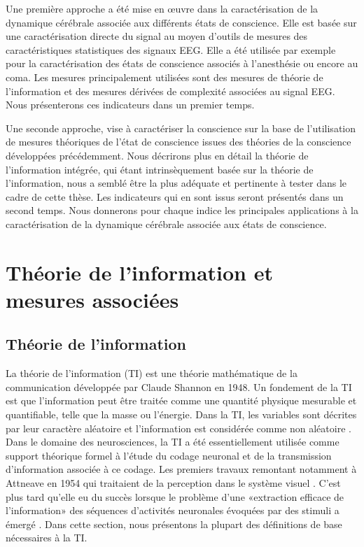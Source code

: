 Une première approche a été mise en œuvre dans la caractérisation de la dynamique cérébrale associée aux différents états de conscience. 
Elle est basée sur une caractérisation directe du signal au moyen d'outils de mesures des caractéristiques statistiques des signaux EEG. 
Elle a été utilisée par exemple pour la caractérisation des états de conscience associés à l'anesthésie ou encore au coma. 
Les mesures principalement utilisées sont des mesures de théorie de l'information et des mesures dérivées de complexité associées au signal EEG. 
Nous présenterons ces indicateurs dans un premier temps. 

Une seconde approche, vise à caractériser la conscience sur la base de l'utilisation de mesures théoriques de l'état de conscience issues des théories de la conscience développées précédemment. 
Nous décrirons plus en détail la théorie de l'information intégrée, qui étant intrinsèquement basée sur la théorie de l'information, nous a semblé être la plus adéquate et pertinente à tester dans le cadre de cette thèse. 
Les indicateurs qui en sont issus seront présentés dans un second temps.
Nous donnerons pour chaque indice les principales applications à la caractérisation de la dynamique cérébrale associée aux états de conscience. 

\section{Théorie de l'information et mesures associées}
\label{theorieinformationmesuresassociees}

\subsection{Théorie de l'information}
\label{theoriedelinformation}

La théorie de l'information (TI) est une théorie mathématique de la communication développée par Claude Shannon en 1948. 
Un fondement de la TI est que l'information peut être traitée comme une quantité physique mesurable et quantifiable, telle que la masse ou l'énergie. 
Dans la TI, les variables sont décrites par leur caractère aléatoire et l'information est considérée comme non aléatoire \citep{shannon1948}. 
Dans le domaine des neurosciences, la TI a été essentiellement utilisée comme support théorique formel à l'étude du codage neuronal et de la transmission d'information associée à ce codage.  
Les premiers travaux remontant notamment à Attneave en 1954 qui traitaient de la perception dans le système visuel \citep{attneave1954some, blanc2012transmission}. 
C'est plus tard qu'elle eu du succès lorsque le problème d'une «extraction efficace de l'information» des séquences d'activités neuronales évoquées par des stimuli a émergé \citep{atick1992could, barlow1961possible, borst1999information}. 
Dans cette section, nous présentons la plupart des définitions de base nécessaires à la TI. 

